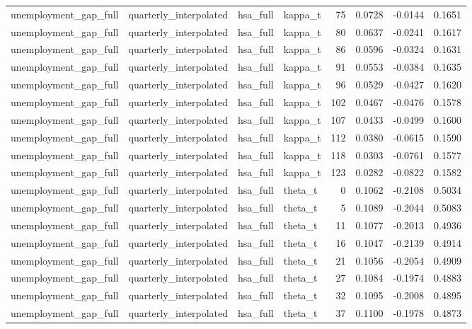\begin{tabular}{llllrrrr}
unemployment\_gap\_full & quarterly\_interpolated & hsa\_full & kappa\_t & 75 & 0.0728 & -0.0144 & 0.1651 \\
unemployment\_gap\_full & quarterly\_interpolated & hsa\_full & kappa\_t & 80 & 0.0637 & -0.0241 & 0.1617 \\
unemployment\_gap\_full & quarterly\_interpolated & hsa\_full & kappa\_t & 86 & 0.0596 & -0.0324 & 0.1631 \\
unemployment\_gap\_full & quarterly\_interpolated & hsa\_full & kappa\_t & 91 & 0.0553 & -0.0384 & 0.1635 \\
unemployment\_gap\_full & quarterly\_interpolated & hsa\_full & kappa\_t & 96 & 0.0529 & -0.0427 & 0.1620 \\
unemployment\_gap\_full & quarterly\_interpolated & hsa\_full & kappa\_t & 102 & 0.0467 & -0.0476 & 0.1578 \\
unemployment\_gap\_full & quarterly\_interpolated & hsa\_full & kappa\_t & 107 & 0.0433 & -0.0499 & 0.1600 \\
unemployment\_gap\_full & quarterly\_interpolated & hsa\_full & kappa\_t & 112 & 0.0380 & -0.0615 & 0.1590 \\
unemployment\_gap\_full & quarterly\_interpolated & hsa\_full & kappa\_t & 118 & 0.0303 & -0.0761 & 0.1577 \\
unemployment\_gap\_full & quarterly\_interpolated & hsa\_full & kappa\_t & 123 & 0.0282 & -0.0822 & 0.1582 \\
unemployment\_gap\_full & quarterly\_interpolated & hsa\_full & theta\_t & 0 & 0.1062 & -0.2108 & 0.5034 \\
unemployment\_gap\_full & quarterly\_interpolated & hsa\_full & theta\_t & 5 & 0.1089 & -0.2044 & 0.5083 \\
unemployment\_gap\_full & quarterly\_interpolated & hsa\_full & theta\_t & 11 & 0.1077 & -0.2013 & 0.4936 \\
unemployment\_gap\_full & quarterly\_interpolated & hsa\_full & theta\_t & 16 & 0.1047 & -0.2139 & 0.4914 \\
unemployment\_gap\_full & quarterly\_interpolated & hsa\_full & theta\_t & 21 & 0.1056 & -0.2054 & 0.4909 \\
unemployment\_gap\_full & quarterly\_interpolated & hsa\_full & theta\_t & 27 & 0.1084 & -0.1974 & 0.4883 \\
unemployment\_gap\_full & quarterly\_interpolated & hsa\_full & theta\_t & 32 & 0.1095 & -0.2008 & 0.4895 \\
unemployment\_gap\_full & quarterly\_interpolated & hsa\_full & theta\_t & 37 & 0.1100 & -0.1978 & 0.4873 \\

\end{tabular}
